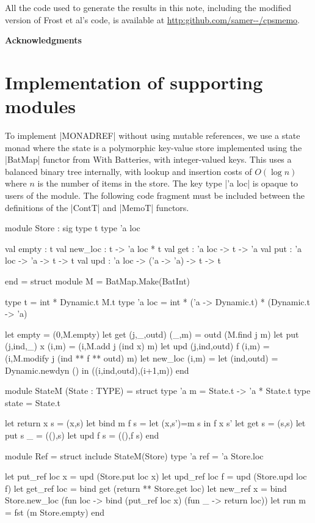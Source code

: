 All the code used to generate the results in this note, including the modified
version of Frost et al's code, is available at \url{http:github.com/samer--/cpsmemo}.

\vspace{1em}
\bigskip
\noindent
\textbf{Acknowledgments}\\
\TheAcknowledgments

\appendix
\section{Implementation of supporting modules}
To implement |MONADREF| without using \OCaml mutable references,
we use a state monad where the state is a polymorphic key-value store implemented
using the |BatMap| functor from \OCaml With Batteries, with integer-valued keys.
This uses a balanced binary tree internally, with
lookup and insertion costs of $O(\log n)$ where $n$ is the number of items
in the store. The key type |'a loc| is opaque to users of the module.
The following code fragment must be included between the definitions of the
|ContT| and |MemoT| functors.
\begin{ocaml}
	module Store : sig
		type t
		type 'a loc

		val empty : t
		val new_loc : t -> 'a loc * t
		val get : 'a loc -> t -> 'a 
		val put : 'a loc -> 'a -> t -> t
		val upd : 'a loc -> ('a -> 'a) -> t -> t

	end = struct
		module M = BatMap.Make(BatInt)

		type t =  int * Dynamic.t M.t
		type 'a loc = int * ('a -> Dynamic.t) * (Dynamic.t -> 'a)

		let empty = (0,M.empty)
		let get (j,_,outd) (_,m)     = outd (M.find j m) 
		let put (j,ind,_) x (i,m)    = (i,M.add j (ind x) m)
		let upd (j,ind,outd) f (i,m) = (i,M.modify j (ind ** f ** outd) m)
		let new_loc (i,m) = let (ind,outd) = Dynamic.newdyn () in 
                        ((i,ind,outd),(i+1,m))
	end

	module StateM (State : TYPE) = struct
		type 'a m = State.t -> 'a * State.t 
		type state = State.t

		let return x s = (x,s)
		let bind m f s = let (x,s')=m s in f x s'
		let get s   = (s,s)
		let put s _ = ((),s)
		let upd f s = ((),f s)
	end

	module Ref = struct
		include StateM(Store)
		type 'a ref = 'a Store.loc

		let put_ref loc x  = upd (Store.put loc x)
		let upd_ref loc f  = upd (Store.upd loc f)
		let get_ref loc    = bind get (return ** Store.get loc)
		let new_ref x = bind Store.new_loc (fun loc ->
										bind (put_ref loc x) (fun _ -> return loc))
		let run m = fst (m Store.empty)
	end
\end{ocaml}
